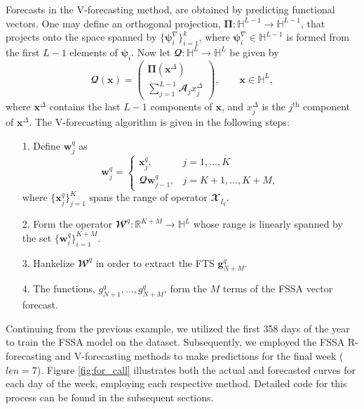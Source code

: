 Forecasts in the V-forecasting method, are obtained by predicting functional vectors. One may define an orthogonal projection, $\pmb{\Pi}:\mathbb{H}^{L-1} \rightarrow \mathbb{H}^{L-1}$, that projects onto the space spanned by $\{\pmb{\psi}_{i}^{\nabla}\}_{i=1}^{k}$, where $\pmb{\psi}_{i}^{\nabla} \in \mathbb{H}^{L-1}$ is formed from the first $L-1$ elements of $\pmb{\psi}_{i}$. Now let $\mathbfcal{Q}:\mathbb{H}^{L} \rightarrow \mathbb{H}^{L}$ be given by 
\begin{equation}
\mathbfcal{Q}\left(\pmb{x}\right)=\begin{pmatrix} \pmb{\Pi}\left(\pmb{x}^{\Delta}\right) \\ \sum_{j=1}^{L-1}\mathbfcal{A}_{j}x^{\Delta}_{j}\end{pmatrix}, \qquad {\pmb{x}} \in \mathbb{H}^{L} \nonumber,
\end{equation}
where $\pmb{x}^{\Delta}$ contains the last $L-1$ components of $\pmb{x}$, and $x_{j}^{\Delta}$ is the $j^{\text{th}}$ component of $\pmb{x}^{\Delta}$. The V-forecasting algorithm is given in the following steps:
\begin{enumerate}
\item[1.] Define $\pmb{w}^{q}_{j}$ as
\[\pmb{w}^{q}_{j}= \begin{cases} 
      \pmb{x}^{q}_{j}, & j=1,\dots, K \\
     \mathbfcal{Q}\pmb{w}^{q}_{j-1}, & j=K+1, \dots, K+M,
   \end{cases}
\]
where $\{\pmb{x}^{q}_{j}\}_{j=1}^{K}$ spans the range of operator $\mathbfcal{X}_{I_{q}}$.
\item[2.] Form the operator $\mathbfcal{W}^q:\mathbb{R}^{K+M} \rightarrow \mathbb{H}^{L}$ whose range is linearly spanned by the set $\{\pmb{w}_{i}^q\}_{i=1}^{K+M}$.
\item[3.] Hankelize $\mathbfcal{W}^q$ in order to extract the FTS $\mathbf{g}^{q}_{N+M}$.
\item[4.] The functions, $g^{q}_{N+1}, \dots, g^{q}_{N+M}$, form the $M$ terms of the FSSA vector forecast.
\end{enumerate}
Continuing from the previous example, we utilized the first 358 days of the year to 
train the FSSA model on the  dataset. Subsequently, we employed the 
FSSA R-forecasting and V-forecasting methods to make predictions for the final week 
($len = 7$). Figure \ref{fig:for_call} illustrates both the actual and forecasted 
curves for each day of the week, employing each respective method. Detailed code for 
this process can be found in the subsequent sections.

